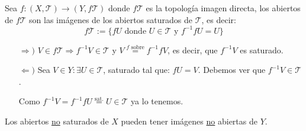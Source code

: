 \begin{prop}
Sea $f : (X, \mathcal{T}) \rightarrow (Y, f\mathcal{T})$ donde $f\mathcal{T}$ es la topología imagen directa, los abiertos de $f\mathcal{T}$ son las imágenes de los abiertos saturados de $\mathcal{T}$, es decir:
\[
f\mathcal{T} := \{fU \mbox{ donde } U \in \mathcal{T} \text{ y } f^{-1}fU = U\}
\]
\end{prop}
\begin{demo}
\begin{itemize}
    \item[$\Rightarrow)$] $V \in f\mathcal{T} \Rightarrow f^{-1}V \in \mathcal{T}$ y $V \stackrel{f \text{ sobre}}{=} f^{-1}fV$, es decir, que $f^{-1} V$ es saturado.
    \item[$\Leftarrow)$]  Sea $V \in Y: \exists U \in \mathcal{T}$, saturado tal que: $fU = V$. Debemos ver que $f^{-1}V \in \mathcal{T}$.

    Como $f^{-1}V = f^{-1}fU \stackrel{\text{sat.}}{=} U \in \mathcal{T}$ ya lo tenemos.
\end{itemize}
\end{demo}

\begin{obs}
Los abiertos \underline{no} saturados de $X$ pueden tener imágenes \underline{no} abiertas de $Y$. 
\end{obs}

